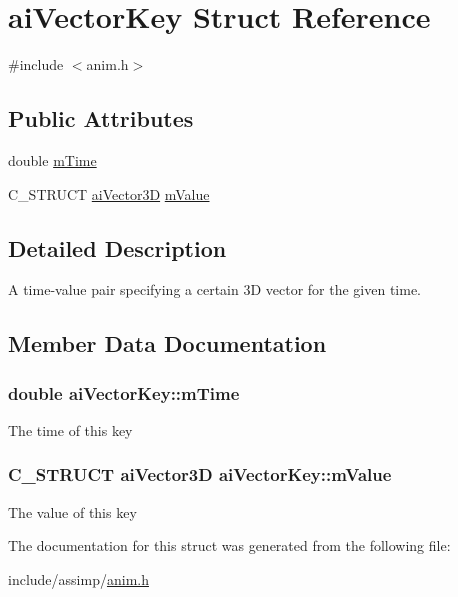 \hypertarget{structaiVectorKey}{\section{ai\-Vector\-Key \-Struct \-Reference}
\label{structaiVectorKey}
}


{\ttfamily \#include $<$anim.\-h$>$}

\subsection*{\-Public \-Attributes}
\begin{DoxyCompactItemize}
\item 
double \hyperlink{structaiVectorKey_ab3c43c166434c7a505083d1929f675bc}{m\-Time}
\item 
\-C\-\_\-\-S\-T\-R\-U\-C\-T \hyperlink{structaiVector3D}{ai\-Vector3\-D} \hyperlink{structaiVectorKey_a6f73649028b136a193dac21de35188ad}{m\-Value}
\end{DoxyCompactItemize}


\subsection{\-Detailed \-Description}
\-A time-\/value pair specifying a certain 3\-D vector for the given time. 

\subsection{\-Member \-Data \-Documentation}
\hypertarget{structaiVectorKey_ab3c43c166434c7a505083d1929f675bc}{
\subsubsection[{m\-Time}]{\setlength{\rightskip}{0pt plus 5cm}double {\bf ai\-Vector\-Key\-::m\-Time}}}\label{structaiVectorKey_ab3c43c166434c7a505083d1929f675bc}
\-The time of this key \hypertarget{structaiVectorKey_a6f73649028b136a193dac21de35188ad}{
\subsubsection[{m\-Value}]{\setlength{\rightskip}{0pt plus 5cm}\-C\-\_\-\-S\-T\-R\-U\-C\-T {\bf ai\-Vector3\-D} {\bf ai\-Vector\-Key\-::m\-Value}}}\label{structaiVectorKey_a6f73649028b136a193dac21de35188ad}
\-The value of this key 

\-The documentation for this struct was generated from the following file\-:\begin{DoxyCompactItemize}
\item 
include/assimp/\hyperlink{anim_8h}{anim.\-h}\end{DoxyCompactItemize}
